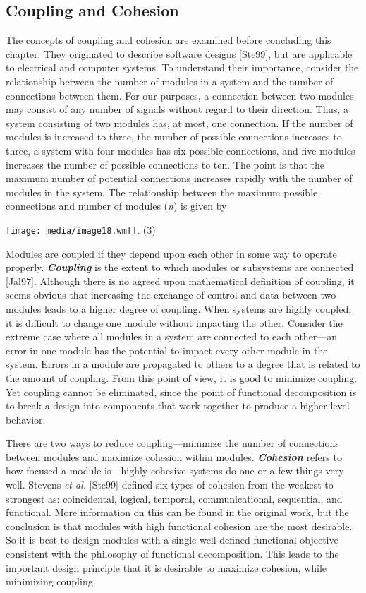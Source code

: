 \subsection{Coupling and Cohesion}\label{coupling-and-cohesion}

The concepts of coupling and cohesion are examined before concluding
this chapter. They originated to describe software designs {[}Ste99{]},
but are applicable to electrical and computer systems. To understand
their importance, consider the relationship between the number of
modules in a system and the number of connections between them. For our
purposes, a connection between two modules may consist of any number of
signals without regard to their direction. Thus, a system consisting of
two modules has, at most, one connection. If the number of modules is
increased to three, the number of possible connections increases to
three, a system with four modules has six possible connections, and five
modules increases the number of possible connections to ten. The point
is that the maximum number of potential connections increases rapidly
with the number of modules in the system. The relationship between the
maximum possible connections and number of modules (\emph{n}) is given
by

\texttt{[image: media/image18.wmf]}. (3)

Modules are coupled if they depend upon each other in some way to
operate properly. \emph{\textbf{Coupling}} is the extent to which
modules or subsystems are connected {[}Jal97{]}. Although there is no
agreed upon mathematical definition of coupling, it seems obvious that
increasing the exchange of control and data between two modules leads to
a higher degree of coupling. When systems are highly coupled, it is
difficult to change one module without impacting the other. Consider the
extreme case where all modules in a system are connected to each
other---an error in one module has the potential to impact every other
module in the system. Errors in a module are propagated to others to a
degree that is related to the amount of coupling. From this point of
view, it is good to minimize coupling. Yet coupling cannot be
eliminated, since the point of functional decomposition is to break a
design into components that work together to produce a higher level
behavior.

There are two ways to reduce coupling---minimize the number of
connections between modules and maximize cohesion within modules.
\emph{\textbf{Cohesion}} refers to how focused a module is---highly
cohesive systems do one or a few things very well. Stevens \emph{et al.}
{[}Ste99{]} defined six types of cohesion from the weakest to strongest
as: coincidental, logical, temporal, communicational, sequential, and
functional. More information on this can be found in the original work,
but the conclusion is that modules with high functional cohesion are the
most desirable. So it is best to design modules with a single
well-defined functional objective consistent with the philosophy of
functional decomposition. This leads to the important design principle
that it is desirable to maximize cohesion, while minimizing coupling.

